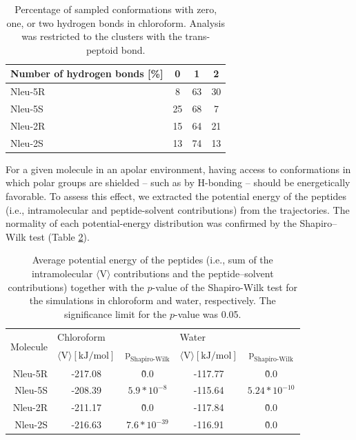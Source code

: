 \begin{table}[h!]
    \centering
    \caption{Percentage of sampled conformations with zero, one, or two hydrogen bonds in chloroform. Analysis was restricted to the clusters with the trans-peptoid bond.}
    \label{tab: hbondsratio}
    \begin{adjustbox}{max width=\textwidth}
    \begin{tabular}{lccc}
    Number of hydrogen bonds [\%] &	0 &	1 &	2 \\
    \hline
    Nleu-5R  &	8	& 63	& 30 \\
    Nleu-5S  &	25	& 68	& 7  \\
    Nleu-2R  &	15	& 64	& 21 \\
    Nleu-2S  &	13	& 74	& 13 \\
    \hline
    \end{tabular}
    \end{adjustbox}
\end{table}

For a given molecule in an apolar environment, having access to conformations in which polar groups are shielded -- such as by H-bonding -- should be energetically favorable. 
To assess this effect, we extracted the potential energy of the peptides (i.e., intramolecular and peptide-solvent contributions) from the trajectories. 
The normality of each potential-energy distribution was confirmed by the Shapiro–Wilk test \cite{Shapiro1965} (Table \ref{tab: SIstatTestingNorm}). 

\begin{table}[h!]
\centering
\caption{Average potential energy of the peptides (i.e., sum of the intramolecular $\langle \text{V} \rangle$ contributions and the peptide–solvent contributions)  together with the $p$-value of the Shapiro-Wilk test for the simulations in chloroform and water, respectively. The significance limit for the $p$-value was 0.05.}
\label{tab: SIstatTestingNorm}
\begin{adjustbox}{max width=\textwidth}
\begin{tabular}{r|cc|cc}
\multirow{2}{*}{Molecule} & \multicolumn{2}{l}{Chloroform} & \multicolumn{2}{l}{Water}        \\
    & $\langle \text{V} \rangle [\text{kJ}/\text{mol}]$ & $\text{p}_{\text{Shapiro-Wilk}}$ & $\langle \text{V} \rangle [\text{kJ}/\text{mol}]$ & $\text{p}_{\text{Shapiro-Wilk}}$  \\
    \hline
    Nleu-5R    & -217.08    & \~0.0          & -117.77  & \~0.0         \\
    Nleu-5S    & -208.39    &   $5.9*10^{-8}$  & -115.64  & $5.24*10^{-10}$ \\
    Nleu-2R    & -211.17    & \~0.0          & -117.84  & \~0.0         \\
    Nleu-2S    & -216.63    &   $7.6*10^{-39}$ & -116.91  & \~0.0   \\
    \hline
\end{tabular}%
\end{adjustbox}
\end{table}

